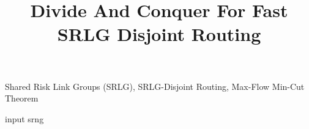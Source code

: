 \documentclass[conference]{IEEEtran}
\begin{document}

\title{Divide And Conquer For Fast SRLG Disjoint Routing}
%

\maketitle

\begin{IEEEkeywords}
Shared Risk Link Groups (SRLG), SRLG-Disjoint Routing, Max-Flow Min-Cut Theorem
\end{IEEEkeywords}








input  srng





%


\end{document}

